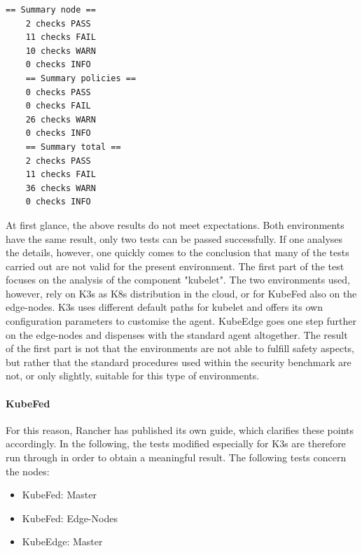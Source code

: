\documentclass[MSC,Master,english]{twbook}%
\begin{document}
\vspace{\baselineskip}
\begin{center}
\begin{minipage}{.40\textwidth}
    \begin{lstlisting}[caption={KubeEdge \& KubeFed bench},captionpos=b]
    == Summary node ==
    2 checks PASS
    11 checks FAIL
    10 checks WARN
    0 checks INFO
    == Summary policies ==
    0 checks PASS
    0 checks FAIL
    26 checks WARN
    0 checks INFO
    == Summary total ==
    2 checks PASS
    11 checks FAIL
    36 checks WARN
    0 checks INFO
    \end{lstlisting}
\end{minipage}
\end{center}

At first glance, the above results do not meet expectations. Both environments have the same result, only two tests can be passed successfully. If one analyses the details, however, one quickly comes to the conclusion that many of the tests carried out are not valid for the present environment. The first part of the test focuses on the analysis of the component "kubelet". The two environments used, however, rely on K3s as \ac{K8s} distribution in the cloud, or for KubeFed also on the edge-nodes. K3s uses different default paths for kubelet and offers its own configuration parameters\cite{k3s-config} to customise the agent. KubeEdge goes one step further on the edge-nodes and dispenses with the standard agent altogether. The result of the first part is not that the environments are not able to fulfill safety aspects, but rather that the standard procedures used within the security benchmark are not, or only slightly, suitable for this type of environments. 

\paragraph{KubeFed} For this reason, Rancher has published its own guide\cite{k3s-assesment}, which clarifies these points accordingly. In the following, the tests modified especially for K3s are therefore run through in order to obtain a meaningful result. The following tests concern the nodes:

\begin{itemize}
    \itemsep0em
    \item KubeFed: Master
    \item KubeFed: Edge-Nodes
    \item KubeEdge: Master 
\end{itemize}
\end{document}
